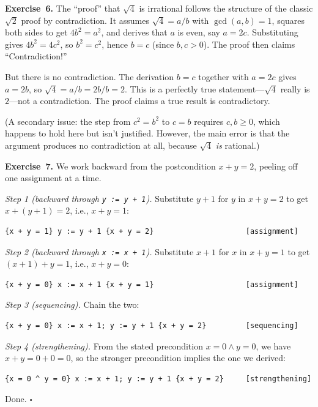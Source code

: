 \documentclass[11pt]{article}
\begin{document}
\medskip
\textbf{Exercise~6.}
The ``proof'' that $\sqrt{4}$ is irrational follows the structure of the
classic $\sqrt{2}$ proof by contradiction. It assumes $\sqrt{4} = a/b$
with $\gcd(a,b) = 1$, squares both sides to get $4b^2 = a^2$, and
derives that $a$ is even, say $a = 2c$. Substituting gives
$4b^2 = 4c^2$, so $b^2 = c^2$, hence $b = c$ (since $b, c > 0$).
The proof then claims ``Contradiction!''

But there is no contradiction. The derivation $b = c$ together with
$a = 2c$ gives $a = 2b$, so $\sqrt{4} = a/b = 2b/b = 2$. This is a
perfectly true statement---$\sqrt{4}$ really is $2$---not a
contradiction. The proof claims a true result is contradictory.

(A secondary issue: the step from $c^2 = b^2$ to $c = b$ requires
$c, b \geq 0$, which happens to hold here but isn't justified.
However, the main error is that the argument produces no contradiction
at all, because $\sqrt{4}$ \emph{is} rational.)

\medskip
\textbf{Exercise~7.}
We work backward from the postcondition $x + y = 2$, peeling off one assignment at a time.

\emph{Step 1 (backward through \texttt{y := y + 1}).} Substitute $y + 1$ for $y$ in $x + y = 2$ to get $x + (y + 1) = 2$, i.e., $x + y = 1$:
\begin{lstlisting}
{x + y = 1} y := y + 1 {x + y = 2}                     [assignment]
\end{lstlisting}

\emph{Step 2 (backward through \texttt{x := x + 1}).} Substitute $x + 1$ for $x$ in $x + y = 1$ to get $(x + 1) + y = 1$, i.e., $x + y = 0$:
\begin{lstlisting}
{x + y = 0} x := x + 1 {x + y = 1}                     [assignment]
\end{lstlisting}

\emph{Step 3 (sequencing).} Chain the two:
\begin{lstlisting}
{x + y = 0} x := x + 1; y := y + 1 {x + y = 2}         [sequencing]
\end{lstlisting}

\emph{Step 4 (strengthening).} From the stated precondition $x = 0 \wedge y = 0$, we have $x + y = 0 + 0 = 0$, so the stronger precondition implies the one we derived:
\begin{lstlisting}
{x = 0 ^ y = 0} x := x + 1; y := y + 1 {x + y = 2}     [strengthening]
\end{lstlisting}
Done. \hfill$\square$
\end{document}
